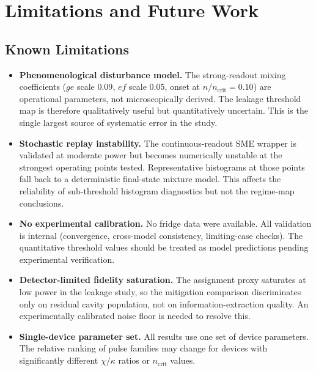 \documentclass[aps,pra,twocolumn,reprint,amsmath,amssymb]{revtex4-2}
\begin{document}
\section{Limitations and Future Work}

\subsection{Known Limitations}

\begin{itemize}
\item \textbf{Phenomenological disturbance model.} The strong-readout mixing coefficients ($ge$ scale $0.09$, $ef$ scale $0.05$, onset at $n/n_\mathrm{crit}=0.10$) are operational parameters, not microscopically derived. The leakage threshold map is therefore qualitatively useful but quantitatively uncertain. This is the single largest source of systematic error in the study.

\item \textbf{Stochastic replay instability.} The continuous-readout SME wrapper is validated at moderate power but becomes numerically unstable at the strongest operating points tested. Representative histograms at those points fall back to a deterministic final-state mixture model. This affects the reliability of sub-threshold histogram diagnostics but not the regime-map conclusions.

\item \textbf{No experimental calibration.} No fridge data were available. All validation is internal (convergence, cross-model consistency, limiting-case checks). The quantitative threshold values should be treated as model predictions pending experimental verification.

\item \textbf{Detector-limited fidelity saturation.} The assignment proxy saturates at low power in the leakage study, so the mitigation comparison discriminates only on residual cavity population, not on information-extraction quality. An experimentally calibrated noise floor is needed to resolve this.

\item \textbf{Single-device parameter set.} All results use one set of device parameters. The relative ranking of pulse families may change for devices with significantly different $\chi/\kappa$ ratios or $n_\mathrm{crit}$ values.
\end{itemize}
\end{document}
